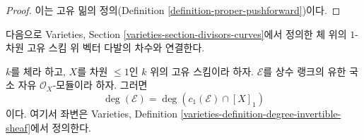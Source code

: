 \begin{proof}
이는 고유 밂의 정의(Definition
\ref{definition-proper-pushforward})이다.
\end{proof}

\noindent
다음으로 Varieties, Section \ref{varieties-section-divisors-curves}에서
정의한 체 위의 $1$-차원 고유 스킴 위 벡터 다발의 차수와 연결한다.

\begin{lemma}
\label{lemma-degree-vector-bundle}
$k$를 체라 하고, $X$를 차원 $\leq 1$인 $k$ 위의 고유 스킴이라 하자.
$\mathcal{E}$를 상수 랭크의 유한 국소 자유
$\mathcal{O}_X$-모듈이라 하자. 그러면
$$
\deg(\mathcal{E}) = \deg(c_1(\mathcal{E}) \cap [X]_1)
$$
이다. 여기서 좌변은 Varieties, Definition
\ref{varieties-definition-degree-invertible-sheaf}에서 정의한다.
\end{lemma}

